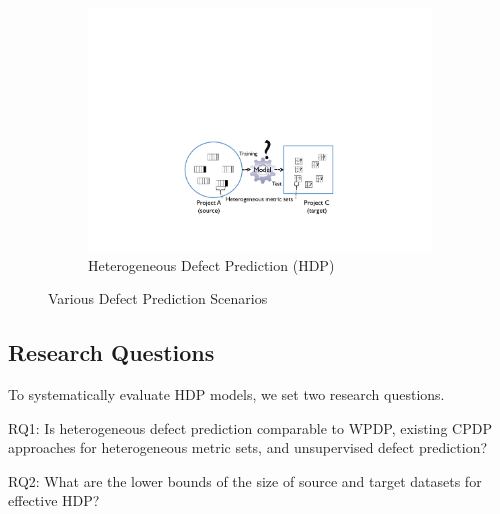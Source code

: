 \begin{figure}[t]
 \begin{subfigure}{0.8\linewidth}
 	\includegraphics[scale=0.5]{Figures/intro/p_crossdomain.pdf}
  	\caption{Heterogeneous Defect Prediction \tiny{(HDP)}}
   	\label{fig:subfig3}
 \end{subfigure}

 \label{fig:type_of_predictions}
 \caption{%
  Various Defect Prediction Scenarios
  }
\end{figure}

\subsection{Research Questions}
To systematically evaluate HDP models, we set
two research questions.
\squishlist
  \item RQ1: Is heterogeneous defect prediction comparable to WPDP, existing CPDP approaches for heterogeneous metric sets, and unsupervised defect prediction?
   \item RQ2: What are the  lower  bounds  of  the  size  of source and target  datasets  for  effective HDP?
\squishend
%

